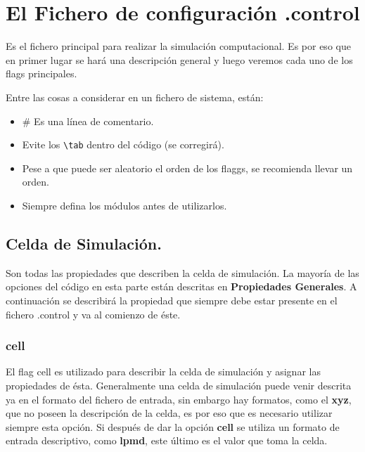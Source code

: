\documentclass[a4paper,10pt]{scrbook}
\begin{document}
\section{El Fichero de configuraci\'on .control}

Es el fichero principal para realizar la simulaci\'on computacional. Es por eso que en primer lugar se har\'a una descripci\'on general y luego veremos cada uno de los flags principales.

Entre las cosas a considerar en un fichero de sistema, est\'an:

\begin{itemize}
 \item \# Es una l\'inea de comentario.
 \item Evite los \verb|\tab| dentro del c\'odigo (se corregir\'a).
 \item Pese a que puede ser aleatorio el orden de los flaggs, se recomienda llevar un orden.
 \item Siempre defina los m\'odulos antes de utilizarlos.
\end{itemize}

\subsection{Celda de Simulaci\'on.}

Son todas las propiedades que describen la celda de simulaci\'on. La mayor\'ia de las opciones del c\'odigo en esta parte est\'an descritas en \textbf{Propiedades Generales}. A continuaci\'on se describir\'a la propiedad que siempre debe estar presente en el fichero .control y va al comienzo de \'este.

\subsubsection{cell}

El flag cell es utilizado para describir la celda de simulaci\'on y asignar las propiedades de \'esta. Generalmente una celda de simulaci\'on puede venir descrita ya en el formato del fichero de entrada, sin embargo hay formatos, como el \textbf{xyz}, que no poseen la descripci\'on de la celda, es por eso que es necesario utilizar siempre esta opci\'on. Si despu\'es de dar la opci\'on \textbf{cell} se utiliza un formato de entrada descriptivo, como \textbf{lpmd}, este \'ultimo es el valor que toma la celda.
\end{document}
